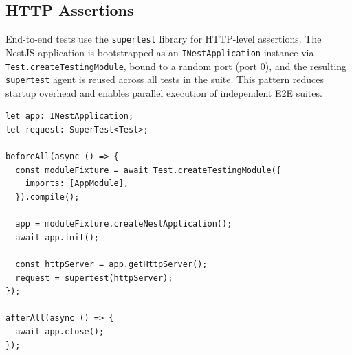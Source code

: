 \subsection{HTTP Assertions}

End-to-end tests use the \texttt{supertest} library for HTTP-level assertions. The NestJS application is bootstrapped as an \texttt{INestApplication} instance via \texttt{Test.createTestingModule}, bound to a random port (port 0), and the resulting \texttt{supertest} agent is reused across all tests in the suite. This pattern reduces startup overhead and enables parallel execution of independent E2E suites.

\begin{lstlisting}[caption=E2E application bootstrap,label=lst:e2e-bootstrap]
let app: INestApplication;
let request: SuperTest<Test>;

beforeAll(async () => {
  const moduleFixture = await Test.createTestingModule({
    imports: [AppModule],
  }).compile();

  app = moduleFixture.createNestApplication();
  await app.init();

  const httpServer = app.getHttpServer();
  request = supertest(httpServer);
});

afterAll(async () => {
  await app.close();
});
\end{lstlisting}
